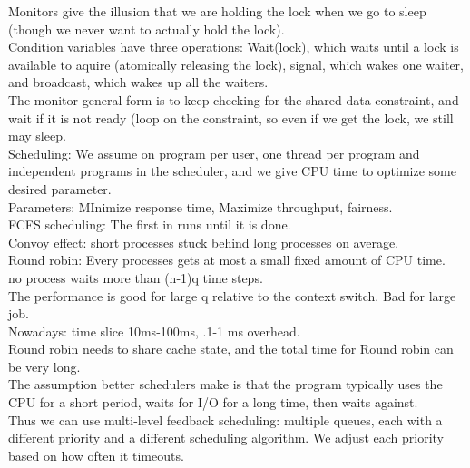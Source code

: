 \documentclass[paper=a4, fontsize=11pt]{scrartcl} %
\numberwithin{equation}{section} %
\numberwithin{figure}{section} %
\numberwithin{table}{section} %
\begin{document}
Monitors give the illusion that we are holding the lock when we go to sleep (though we never want to actually hold the lock). \\
Condition variables have three operations: Wait(lock), which waits until a lock is available to aquire (atomically releasing the lock), signal, which wakes one waiter, and broadcast, which wakes up all the waiters.\\
The monitor general form is to keep checking for the shared data constraint, and wait if it is not ready (loop on the constraint, so even if we get the lock, we still may sleep. \\
Scheduling: We assume on program per user, one thread per program and independent programs in the scheduler, and we give CPU time to optimize some desired parameter. \\
Parameters: MInimize response time, Maximize throughput, fairness. \\
FCFS scheduling: The first in runs until it is done. \\
Convoy effect: short processes stuck behind long processes on average. \\
Round robin: Every processes gets at most a small fixed amount of CPU time. \\
no process waits more than (n-1)q time steps. \\
The performance is good for large q relative to the context switch. Bad for large job. \\
Nowadays: time slice 10ms-100ms, .1-1 ms overhead. \\
Round robin needs to share cache state, and the total time for Round robin can be very long.\\
The assumption better schedulers make is that the program typically uses the CPU for a short period, waits for I/O for a long time, then waits against. \\
Thus we can use multi-level feedback scheduling: multiple queues, each with a different priority and a different scheduling algorithm. We adjust each priority based on how often it timeouts.
\end{document}
